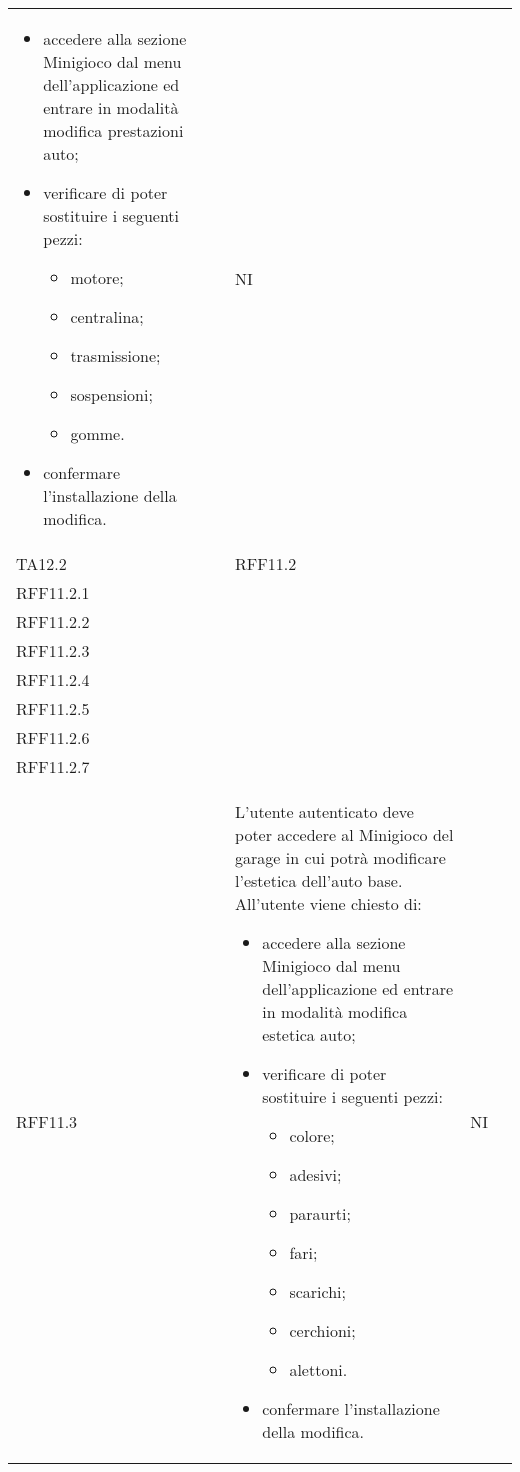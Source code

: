 \begin{longtable}{ >{\centering}p{} >{\centering}p{} >{\centering}p{}
			>{\centering}p{}}
\begin{itemize}
		 	\item accedere alla sezione Minigioco dal menu dell'applicazione ed entrare in modalità modifica prestazioni auto;
		 	\item verificare di poter sostituire i seguenti pezzi:
		 		\begin{itemize}
		 			\item motore;
		 			\item centralina;
		 			\item trasmissione;
		 			\item sospensioni;
		 			\item gomme.
		 		\end{itemize}
		 	\item confermare l'installazione della modifica.
		 \end{itemize}	&	NI	\tabularnewline
		 TA12.2	& RFF11.2\\ RFF11.2.1 \\ RFF11.2.2 \\ RFF11.2.3 \\ RFF11.2.4 \\ RFF11.2.5  \\ 	RFF11.2.6 \\ RFF11.2.7 \\RFF11.3 & L'utente autenticato deve poter accedere al Minigioco del garage in cui potrà modificare l'estetica dell'auto base. All'utente viene chiesto di:
		 \begin{itemize}
		 	\item accedere alla sezione Minigioco dal menu dell'applicazione ed entrare in modalità modifica estetica auto;
		 	\item verificare di poter sostituire i seguenti pezzi:
		 		\begin{itemize}
		 			\item colore;
		 			\item adesivi;
		 			\item paraurti;
		 			\item fari;
		 			\item scarichi;
		 			\item cerchioni;
		 			\item alettoni.
		 		\end{itemize}
		 	\item confermare l'installazione della modifica.
		 \end{itemize}	&	NI	\tabularnewline
\end{longtable}
\newpage
